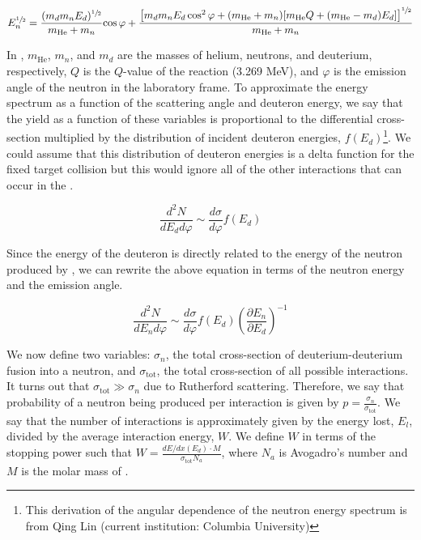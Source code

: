 \begin{equation}
        \label{eqn:nerix_neutron_energy}
        \begin{split}
                E_n^{\sfrac{1}{2}} = \frac{(m_d m_n E_d)^{\sfrac{1}{2}}}{m_{\textrm{He}} + m_n} \textrm{cos} \, \varphi  + \frac{\left[ m_d m_n E_d \, \textrm{cos}^2 \, \varphi + (m_{\textrm{He}} + m_n) [ m_{\textrm{He}} Q + (m_{\textrm{He}} - m_d) E_d ] \right]^{\sfrac{1}{2}}}{m_{\textrm{He}} + m_n}
        \end{split}
\end{equation}

In , $m_{\textrm{He}}$, $m_n$, and $m_d$ are the masses of helium, neutrons, and deuterium, respectively, $Q$ is the $Q$-value of the reaction (3.269 MeV), and $\varphi$ is the emission angle of the neutron in the laboratory frame.  To approximate the energy spectrum as a function of the scattering angle and deuteron energy, we say that the yield as a function of these variables is proportional to the differential cross-section multiplied by the distribution of incident deuteron energies, $f(E_d)$\footnote{This derivation of the angular dependence of the neutron energy spectrum is from Qing Lin (current institution: Columbia University)}.  We could assume that this distribution of deuteron energies is a delta function for the fixed target collision but this would ignore all of the other interactions that can occur in the \titde{}.  

\begin{equation}
        \frac{d^2 N}{d E_d d \varphi} \sim \frac{d \sigma}{d \varphi} f(E_d)
\end{equation}

Since the energy of the deuteron is directly related to the energy of the neutron produced by , we can rewrite the above equation in terms of the neutron energy and the emission angle.

\begin{equation}
        \frac{d^2 N}{d E_n d \varphi} \sim \frac{d \sigma}{d \varphi} f(E_d) \left( \frac{\partial E_n}{\partial E_d} \right)^{-1}
\end{equation}

We now define two variables: $\sigma_n$, the total cross-section of deuterium-deuterium fusion into a neutron, and $\sigma_{\textrm{tot}}$, the total cross-section of all possible interactions.  It turns out that $\sigma_{\textrm{tot}} \gg \sigma_n$ due to Rutherford scattering.  Therefore, we say that probability of a neutron being produced per interaction is given by $p = \frac{\sigma_n}{\sigma_{\textrm{tot}}}$.  We say that the number of interactions is approximately given by the energy lost, $E_l$, divided by the average interaction energy, $W$.  We define $W$ in terms of the stopping power such that $W = \frac{dE / dx(E_d) \cdot M}{\sigma_{\textrm{tot}} N_a}$, where $N_a$ is Avogadro's number and $M$ is the molar mass of \titde{}.

